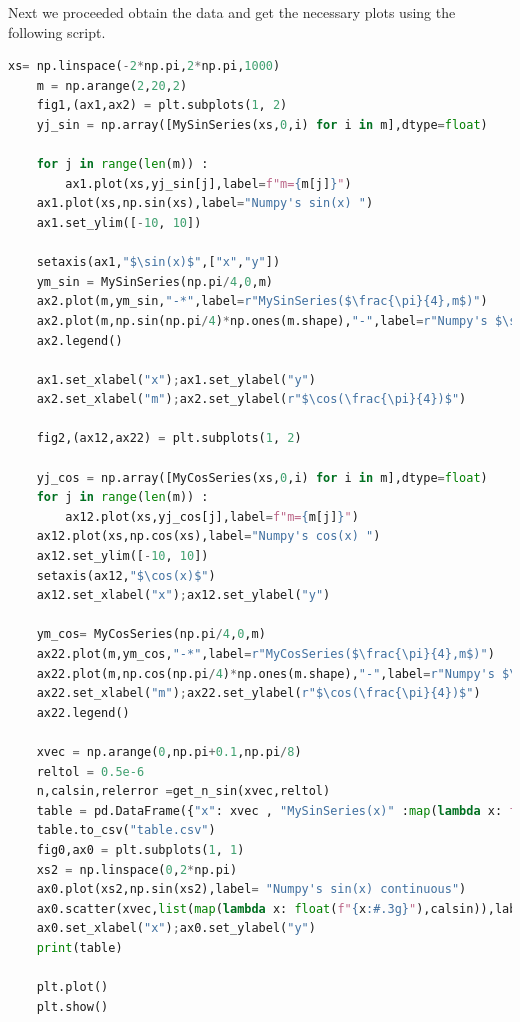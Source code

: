 \documentclass[12pt]{article}
\begin{document}
\noindent
Next we proceeded obtain the data and get the necessary plots using the following script.
\begin{lstlisting}[language=Python]
    xs= np.linspace(-2*np.pi,2*np.pi,1000)
    m = np.arange(2,20,2)
    fig1,(ax1,ax2) = plt.subplots(1, 2)
    yj_sin = np.array([MySinSeries(xs,0,i) for i in m],dtype=float)
    
    for j in range(len(m)) : 
        ax1.plot(xs,yj_sin[j],label=f"m={m[j]}")
    ax1.plot(xs,np.sin(xs),label="Numpy's sin(x) ")
    ax1.set_ylim([-10, 10])
    
    setaxis(ax1,"$\sin(x)$",["x","y"])
    ym_sin = MySinSeries(np.pi/4,0,m) 
    ax2.plot(m,ym_sin,"-*",label=r"MySinSeries($\frac{\pi}{4},m$)")
    ax2.plot(m,np.sin(np.pi/4)*np.ones(m.shape),"-",label=r"Numpy's $\sin(\frac{\pi}{4})$")
    ax2.legend()

    ax1.set_xlabel("x");ax1.set_ylabel("y")
    ax2.set_xlabel("m");ax2.set_ylabel(r"$\cos(\frac{\pi}{4})$")

    fig2,(ax12,ax22) = plt.subplots(1, 2)

    yj_cos = np.array([MyCosSeries(xs,0,i) for i in m],dtype=float)
    for j in range(len(m)) : 
        ax12.plot(xs,yj_cos[j],label=f"m={m[j]}")
    ax12.plot(xs,np.cos(xs),label="Numpy's cos(x) ")
    ax12.set_ylim([-10, 10])
    setaxis(ax12,"$\cos(x)$")
    ax12.set_xlabel("x");ax12.set_ylabel("y")

    ym_cos= MyCosSeries(np.pi/4,0,m) 
    ax22.plot(m,ym_cos,"-*",label=r"MyCosSeries($\frac{\pi}{4},m$)")
    ax22.plot(m,np.cos(np.pi/4)*np.ones(m.shape),"-",label=r"Numpy's $\cos(\frac{\pi}{4})$")
    ax22.set_xlabel("m");ax22.set_ylabel(r"$\cos(\frac{\pi}{4})$")
    ax22.legend()

    xvec = np.arange(0,np.pi+0.1,np.pi/8)
    reltol = 0.5e-6
    n,calsin,relerror =get_n_sin(xvec,reltol)
    table = pd.DataFrame({"x": xvec , "MySinSeries(x)" :map(lambda x: f"{x:#.9g}",calsin),"n":n ,"Numpy's sin(x)":map(lambda x: f"{x:#.9g}",np.sin(xvec))})
    table.to_csv("table.csv")
    fig0,ax0 = plt.subplots(1, 1)
    xs2 = np.linspace(0,2*np.pi)
    ax0.plot(xs2,np.sin(xs2),label= "Numpy's sin(x) continuous")
    ax0.scatter(xvec,list(map(lambda x: float(f"{x:#.3g}"),calsin)),label = "MySinSeries() with 3 significant digits")
    ax0.set_xlabel("x");ax0.set_ylabel("y")
    print(table)

    plt.plot()
    plt.show()
\end{lstlisting}

%
\newpage
\end{document}
